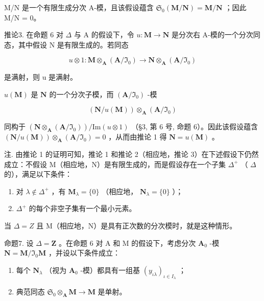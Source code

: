 M/N 是一个有限生成分次 A-模，且该假设蕴含 \(\mathfrak{S}_{0}(\mathbf{M}/\mathbf{N}) = \mathbf{M}/\mathbf{N}\) ；因此 M/N = 0。

推论3. 在命题 6 对 \(\Delta\) 与 A 的假设下，令 \(u: \mathbf{M} \to \mathbf{N}\) 是分次右 A-模的一个分次同态，其中假设 N 是有限生成的。若同态

\[
u \otimes 1: \mathbf {M} \otimes_ {\mathbf {A}} (\mathbf {A} / \mathfrak {I} _ {0}) \rightarrow \mathbf {N} \otimes_ {\mathbf {A}} (\mathbf {A} / \mathfrak {I} _ {0})
\]

是满射，则 u 是满射。

\(u(\mathbf{M})\) 是 \(\mathbf{N}\) 的一个分次子模，而 \((\mathbf{A} / \mathfrak{I}_0)\) -模

\[
(\mathbf {N} / u (\mathbf {M})) \otimes_ {\mathbf {A}} (\mathbf {A} / \mathfrak {I} _ {0})
\]

同构于 \((\mathbf{N} \otimes_{\mathbf{A}} (\mathbf{A} / \mathfrak{I}_0)) / \mathrm{Im}(u \otimes 1)\) （§3, 第 6 号, 命题 6）。因此该假设蕴含 \((\mathbf{N} / u(\mathbf{M})) \otimes_{\mathbf{A}} (\mathbf{A} / \mathfrak{I}_0) = 0\) ，从而由推论 1 得 \(\mathbf{N} = u(\mathbf{M})\) 。

注. 由推论 1 的证明可知，推论 1 和推论 2（相应地，推论 3）在下述假设下仍然成立：不假设 M（相应地，N）是有限生成的，而是假设存在一个子集 \(\Delta^{+}\) （ \(\Delta\) 的），满足以下条件：

\begin{enumerate}
\def\labelenumi{(\arabic{enumi})}
\item
  对 \(\lambda \notin \Delta^{+}\) ，有 \(\mathbf{M}_{\lambda} = \{0\}\) （相应地， \(\mathbf{N}_{\lambda} = \{0\}\) ）；
\item
  \(\Delta^{+}\) 的每个非空子集有一个最小元素。
\end{enumerate}

当 \(\Delta = Z\) 且 M（相应地，N）是具有正次数的分次模时，就是这种情形。

命题7. 设 \(\Delta = \mathbf{Z}\) 。在命题 6 对 A 和 M 的假设下，考虑分次 \(\mathbf{A}_0\) -模 \(\mathbf{N} = \mathbf{M} / \Im_0\mathbf{M}\) ，并设以下条件成立：

\begin{enumerate}
\def\labelenumi{(\roman{enumi})}
\item
  每个 \(\mathbf{N}_{\lambda}\) （视为 \(\mathbf{A}_0\) -模）都具有一组基 \((y_{\iota \lambda})_{\iota \in I_{\lambda}}\) ；
\item
  典范同态 \(\mathfrak{S}_0\otimes_{\mathbf{A}}\mathbf{M}\to \mathbf{M}\) 是单射。
\end{enumerate}

